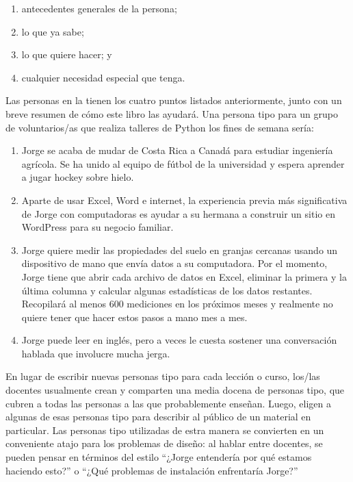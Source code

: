 \begin{enumerate}
 
\item
antecedentes generales de la persona;
 
\item
lo que ya sabe;
 
\item
lo que quiere hacer;
y
 
\item
cualquier necesidad especial que tenga.
 
\end{enumerate}
 Las personas en la  tienen los cuatro puntos listados anteriormente,
junto con un breve resumen de cómo este libro las ayudará.
Una persona tipo para un grupo de voluntarios/as que realiza talleres de Python los fines de semana sería:
 
\begin{enumerate}
 
\item
 Jorge se acaba de mudar de Costa Rica a Canadá para estudiar ingeniería agrícola.
Se ha unido al equipo de fútbol de la universidad
y espera aprender a jugar hockey sobre hielo.
 
\item
Aparte de usar Excel, Word e internet,
la experiencia previa más significativa de Jorge con computadoras
es ayudar a su hermana a construir un sitio en WordPress
para su negocio familiar.
 
 
\item
  Jorge quiere medir las propiedades del suelo en granjas cercanas
usando un dispositivo de mano que envía datos a su computadora.
Por el momento, Jorge tiene que abrir cada archivo de datos en Excel,
eliminar la primera y la última columna
y calcular algunas estadísticas de los datos restantes.
Recopilará al menos 600 mediciones en los próximos meses
y realmente no quiere tener que hacer estos pasos a mano mes a mes.
 
\item
Jorge puede leer en inglés,
pero a veces le cuesta sostener una conversación hablada que involucre mucha jerga.
 
\end{enumerate}
 
En lugar de escribir nuevas personas tipo para cada lección o curso,
los/las docentes usualmente crean y comparten una media docena de personas tipo,
que cubren a todas las personas a las que probablemente enseñan.
Luego, eligen a algunas de esas personas tipo para describir al público de un material en particular.
Las personas tipo utilizadas de estra manera se convierten en un conveniente atajo para los problemas de diseño:
al hablar entre docentes, 
se pueden pensar en términos del estilo
``¿Jorge entendería por qué estamos haciendo esto?''
o
``¿Qué problemas de instalación enfrentaría Jorge?''
 

